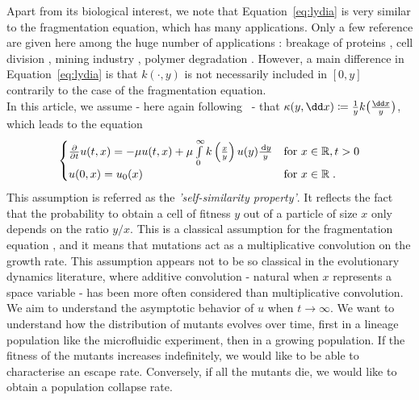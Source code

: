 Apart from its biological interest, we note that Equation~\eqref{eq:lydia} is very similar to the fragmentation equation, which has many applications. Only a few reference are given here among the huge number of applications : breakage of proteins \cite{xue2013imaging}, cell division \cite{doumic2013estimating}, mining industry \cite{kolmogorov1941logarithmic, bertoin2005fragmentation}, polymer degradation \cite{montroll1940theory,ziff1985kinetics}. However, a main difference in Equation~\eqref{eq:lydia} is that $k(\cdot, y)$ is not necessarily included in $[0, y]$ contrarily to the case of the fragmentation equation. \\

In this article, we assume {\MD - here again following~\cite{robert2018mutation} - } that $\kappa(y,\dd x) \coloneqq \f{1}{y}k \big(\frac{\dd x}{y}\big)$, which leads to the equation
\begin{equation}
    \begin{cases}
    \frac{\partial}{\partial t} u(t,x) = - \mu u(t,x) + \mu \int\limits_0^\infty k\left(\frac{x}{y}\right) u(y) \frac{\,\mathrm{d} y}{y} 
    & \text{for } x \in \mathbb{R},  t > 0
    \\
    u(0,x) = u_0(x)  & \text{for } x \in \mathbb{R} \; .
    \label{eq:lydia_selfsimilar}
    \end{cases}
\end{equation}
This assumption is referred as the \textit{'self-similarity property'}. It reflects the fact that the probability to obtain a cell of fitness $y$ out of a particle of size $x$ only depends on the ratio $y/x$. This is a classical assumption for the fragmentation equation \cite{escobedo2005self}, {\MD and it means that mutations act as a multiplicative convolution on the growth rate. This assumption appears not to be so classical in the evolutionary dynamics literature, where additive convolution - natural when $x$ represents a space variable - has been more often considered than multiplicative convolution}. \\
    
We aim to understand the asymptotic behavior of $u$ when $t \to \infty$. We want to understand how the distribution of mutants evolves over time, first in a lineage population like the microfluidic experiment, then in a growing population. If the fitness of the mutants increases indefinitely, we would like to be able to characterise an escape rate. Conversely, if all the mutants die, we would like to obtain a population collapse rate. %
    

